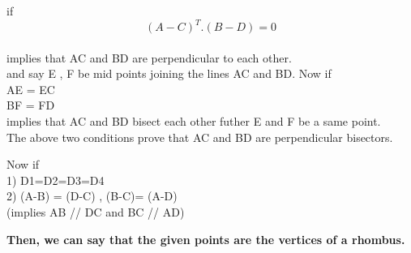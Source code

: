 \documentclass{article}
\begin{document}
\vspace{20cm}



if $$( A-C )^T . ( B-D ) = 0 $$\\
implies that AC and BD are perpendicular to each other.\\ 

and say E , F be mid points joining the lines AC and BD. Now if\\
AE = EC \\
BF = FD \\ 
implies that AC and BD bisect each other futher E and F be a same point.\\

The above two conditions prove that AC and BD are perpendicular bisectors.
\vspace{5mm} %

Now if \\ 1) D1=D2=D3=D4\\ 
2) \pm(A-B) = \pm \hspace{1mm} (D-C) ,\hspace{2mm} \pm(B-C)= \pm(A-D)\\
  (implies\hspace{2mm} AB // DC\hspace{2mm} and \hspace{2mm}BC // AD)\\

\vspace{5mm} %
\textbf{Then, we can say that the given points are the vertices of a rhombus.}
\end{document}
